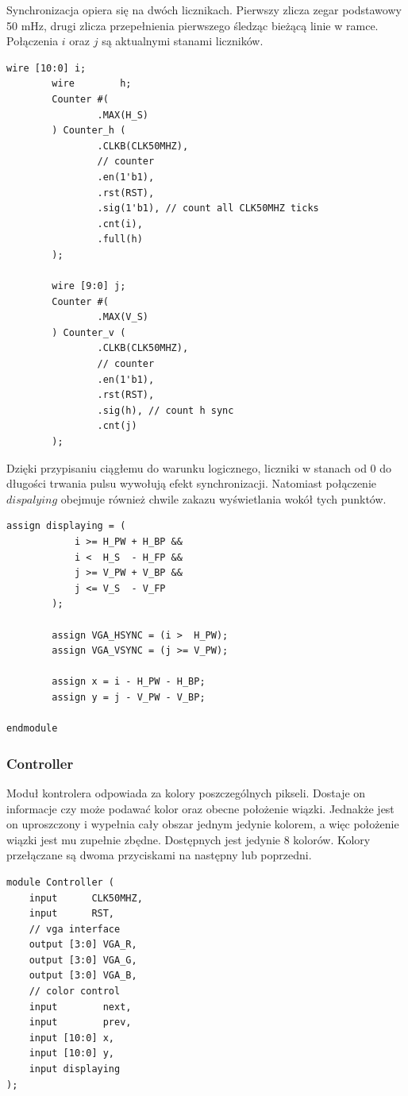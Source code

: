 \documentclass[a4paper,12pt]{article}
\begin{document}
Synchronizacja opiera się na dwóch licznikach. Pierwszy zlicza zegar podstawowy 50 mHz, drugi zlicza przepełnienia pierwszego śledząc bieżącą linie w ramce. Połączenia $i$ oraz $j$ są aktualnymi stanami liczników.
\begin{lstlisting}[label=Syncvga,caption=Sync.v,firstnumber=23]
        wire [10:0] i;
        wire        h;
        Counter #(
                .MAX(H_S)
        ) Counter_h (
                .CLKB(CLK50MHZ),
                // counter
                .en(1'b1),
                .rst(RST),
                .sig(1'b1), // count all CLK50MHZ ticks
                .cnt(i),
                .full(h)
        );

        wire [9:0] j;
        Counter #(
                .MAX(V_S)
        ) Counter_v (
                .CLKB(CLK50MHZ),
                // counter
                .en(1'b1),
                .rst(RST),
                .sig(h), // count h sync
                .cnt(j)
        );
\end{lstlisting}

Dzięki przypisaniu ciągłemu do warunku logicznego, liczniki w stanach od 0 do długości trwania pulsu wywołują efekt synchronizacji. Natomiast połączenie $dispalying$ obejmuje również chwile zakazu wyświetlania wokół tych punktów.
\begin{lstlisting}[label=Syncvga,caption=Sync.v,firstnumber=49]
        assign displaying = (
            i >= H_PW + H_BP &&
            i <  H_S  - H_FP &&
            j >= V_PW + V_BP &&
            j <= V_S  - V_FP
        );

        assign VGA_HSYNC = (i >  H_PW);
        assign VGA_VSYNC = (j >= V_PW);

        assign x = i - H_PW - H_BP;
        assign y = j - V_PW - V_BP;

endmodule
\end{lstlisting}

\subsubsection{Controller}

Moduł kontrolera odpowiada za kolory poszczególnych pikseli. Dostaje on informacje czy może podawać kolor oraz obecne położenie wiązki. Jednakże jest on uproszczony i wypełnia cały obszar jednym jedynie kolorem, a więc  położenie wiązki jest mu zupełnie zbędne. Dostępnych jest jedynie 8 kolorów. Kolory przełączane są dwoma przyciskami na następny lub poprzedni.
\begin{lstlisting}[label=Syncvga,caption=Sync.v,firstnumber=49]
module Controller (
    input      CLK50MHZ,
    input      RST,
    // vga interface
    output [3:0] VGA_R,
    output [3:0] VGA_G,
    output [3:0] VGA_B,
    // color control
    input        next,
    input        prev,
    input [10:0] x,
    input [10:0] y,
    input displaying
);
\end{lstlisting}
\end{document}
